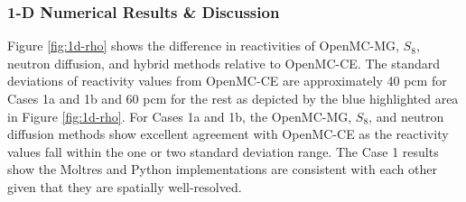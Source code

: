 %
%

\FloatBarrier

\subsubsection{1-D Numerical Results \& Discussion} \label{sec:1d-results-sub}


Figure \ref{fig:1d-rho} shows the difference in reactivities of OpenMC-MG, $S_8$,
neutron diffusion, and hybrid methods relative to OpenMC-CE. The standard deviations of
reactivity values from OpenMC-CE are approximately 40 pcm for Cases 1a and 1b and 60 pcm for the
rest as depicted by the blue highlighted area in Figure \ref{fig:1d-rho}. For Cases 1a and 1b, the
OpenMC-MG, $S_8$, and neutron diffusion methods show excellent agreement with OpenMC-CE as the
reactivity values fall within the one or two standard deviation range. The Case 1 results show
the Moltres and Python implementations are consistent with each other given that they are spatially
well-resolved.

